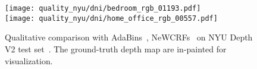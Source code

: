 \documentclass{article} \usepackage{iclr2023_conference, times}
\begin{document}
\begin{figure}[t]
{\begin{minipage}[b]{0.18\textwidth}
\texttt{[image: quality\_nyu/dni/bedroom\_rgb\_01193.pdf]}\\
\texttt{[image: quality\_nyu/dni/home\_office\_rgb\_00557.pdf]}\\
\end{minipage}
}
\caption{Qualitative comparison with AdaBins~\citep{bhat2021adabins}, NeWCRFs~\citep{yuan2022new} on NYU Depth V2 test set~\citep{silberman2012indoor}. The ground-truth depth map are in-painted for visualization.}
\label{fig:qual_nyu}
\end{figure}
\end{document}
